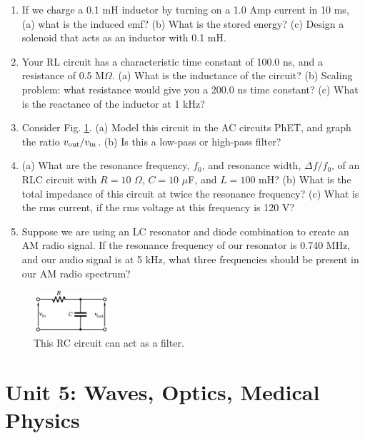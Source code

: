 \documentclass[12pt,twocolumn]{article}
\begin{document}
\begin{enumerate}
\item If we charge a 0.1 mH inductor by turning on a 1.0 Amp current in 10 ms, (a) what is the induced emf? (b) What is the stored energy? (c) Design a solenoid that acts as an inductor with 0.1 mH. \\ \vspace{2cm}
\item Your RL circuit has a characteristic time constant of 100.0 ns, and a resistance of 0.5 M$\Omega$. (a) What is the inductance of the circuit? (b) Scaling problem: what resistance would give you a 200.0 ns time constant? (c) What is the reactance of the inductor at 1 kHz? \\ \vspace{2cm}
\item Consider Fig. \ref{fig:RC}.  (a) Model this circuit in the AC circuits PhET, and graph the ratio $v_{\rm out}/v_{\rm in}$. (b) Is this a low-pass or high-pass filter? \\ \vspace{3cm}
\item (a) What are the resonance frequency, $f_0$, and resonance width, $\Delta f/f_0$, of an RLC circuit with $R = 10$ $\Omega$, $C = 10$ $\mu$F, and $L = 100$ mH? (b) What is the total impedance of this circuit at twice the resonance frequency? (c) What is the rms current, if the rms voltage at this frequency is 120 V? \\ \vspace{1.5cm}
\item Suppose we are using an LC resonator and diode combination to create an AM radio signal.  If the resonance frequency of our resonator is 0.740 MHz, and our audio signal is at 5 kHz, what three frequencies should be present in our AM radio spectrum? \\ \vspace{1cm}
\end{enumerate}

\begin{figure}
\centering
\includegraphics[width=0.25\textwidth]{low-pass.png}
\caption{\label{fig:RC} \small This RC circuit can act as a filter.}
\end{figure}

\section{Unit 5: Waves, Optics, Medical Physics}
\end{document}
